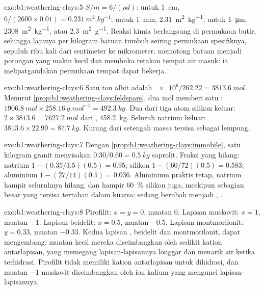 \begin{solution}{exo:b1:weathering-clays:5}
$S/m = 6/(\rho d)$: untuk \qty{1}{cm}, $6/(2600\times0.01) =
\qty{0.231}{m^2.kg^{-1}}$; untuk \qty{1}{mm}, \qty{2.31}{m^2.kg^{-1}}; untuk
\qty{1}{\micro m}, \qty{2308}{m^2.kg^{-1}}, atau \qty{2.3}{m^2.g^{-1}}.
Reaksi kimia berlangsung di permukaan butir, sehingga lajunya per kilogram batuan
tumbuh seiring permukaan spesifiknya, sepuluh ribu kali dari sentimeter ke
mikrometer.  memotong batuan menjadi potongan yang makin kecil dan
membuka retakan tempat air masuk: ia melipatgandakan permukaan tempat  dapat bekerja.
\end{solution}

\begin{solution}{exo:b1:weathering-clays:6}
Satu ton albit adalah $\num{e6}/262.22 = \qty{3813.6}{mol}$. Menurut
\cref{prop:b1:weathering-clays:feldspars}, dua mol memberi satu :
$\qty{1906.8}{mol} \times \qty{258.16}{g.mol^{-1}} = \qty{492.3}{kg}$. Dua dari
tiga atom silikon keluar: $2\times3813.6 = \qty{7627.2}{mol}$ dari
, \qty{458.2}{kg}. Seluruh natrium keluar: $3813.6\times22.99 =
\qty{87.7}{kg}$. Kurang dari setengah massa  tersisa sebagai lempung.
\end{solution}

\begin{solution}{exo:b1:weathering-clays:7}
Dengan \cref{prop:b1:weathering-clays:immobile}, satu kilogram granit menyisakan
$0.30/0.60 = \qty{0.5}{kg}$ saprolit. Fraksi yang hilang: natrium $1 -
(0.35/3.5)(0.5) = 0.95$; silikon $1 - (60/72)(0.5) = 0.583$; aluminium $1 -
(27/14)(0.5) = 0.036$. Aluminium praktis tetap, natrium hampir seluruhnya hilang,
dan hampir \qty{60}{\percent} silikon juga, meskipun sebagian besar yang tersisa
tertahan dalam kuarsa:  sedang berubah menjadi , .
\end{solution}

\begin{solution}{exo:b1:weathering-clays:8}
Pirofilit: $x = y = 0$, muatan 0. Lapisan muskovit: $x = 1$, muatan $-1$.
Lapisan beidelit: $x = 0.5$, muatan $-0.5$. Lapisan montmorilonit: $y = 0.33$,
muatan $-0.33$. Kedua lapisan , beidelit dan montmorilonit, dapat
mengembang: muatan kecil mereka diseimbangkan oleh sedikit kation antarlapisan,
yang memegang lapisan-lapisannya longgar dan menarik air ketika terhidrasi.
Pirofilit tidak memiliki kation antarlapisan untuk dihidrasi, dan muatan $-1$
muskovit diseimbangkan oleh ion kalium yang mengunci lapisan-lapisannya.
\end{solution}

